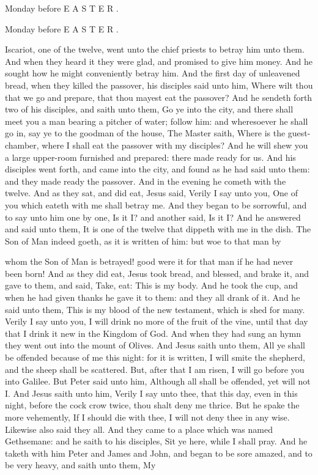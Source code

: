 Monday before E A S T E R .

Monday before E A S T E R .

Iscariot, one of the twelve, went unto the chief priests to betray him unto them. And when they heard it they were glad, and promised to give him money. And he sought how he might conveniently betray him. And the first day of unleavened bread, when they killed the passover, his disciples said unto him, Where wilt thou that we go and prepare, that thou mayest eat the passover? And he sendeth forth two of his disciples, and saith unto them, Go ye into the city, and there shall meet you a man bearing a pitcher of water; follow him: and wheresoever he shall go in, say ye to the goodman of the house, The Master saith, Where is the guest-chamber, where I shall eat the passover with my disciples? And he will shew you a large upper-room furnished and prepared: there made ready for us. And his disciples went forth, and came into the city, and found as he had said unto them: and they made ready the passover. And in the evening he cometh with the twelve. And as they sat, and did eat, Jesus said, Verily I say unto you, One of you which eateth with me shall betray me. And they began to be sorrowful, and to say unto him one by one, Is it I? and another said, Is it I? And he answered and said unto them, It is one of the twelve that dippeth with me in the dish. The Son of Man indeed goeth, as it is written of him: but woe to that man by

whom the Son of Man is betrayed! good were it for that man if he had never been born! And as they did eat, Jesus took bread, and blessed, and brake it, and gave to them, and said, Take, eat: This is my body. And he took the cup, and when he had given thanks he gave it to them: and they all drank of it. And he said unto them, This is my blood of the new testament, which is shed for many. Verily I say unto you, I will drink no more of the fruit of the vine, until that day that I drink it new in the Kingdom of God. And when they had sung an hymn they went out into the mount of Olives. And Jesus saith unto them, All ye shall be offended because of me this night: for it is written, I will smite the shepherd, and the sheep shall be scattered. But, after that I am risen, I will go before you into Galilee. But Peter said unto him, Although all shall be offended, yet will not I. And Jesus saith unto him, Verily I say unto thee, that this day, even in this night, before the cock crow twice, thou shalt deny me thrice. But he spake the more vehemently, If I should die with thee, I will not deny thee in any wise. Likewise also said they all. And they came to a place which was named Gethsemane: and he saith to his disciples, Sit ye here, while I shall pray. And he taketh with him Peter and James and John, and began to be sore amazed, and to be very heavy, and saith unto them, My

